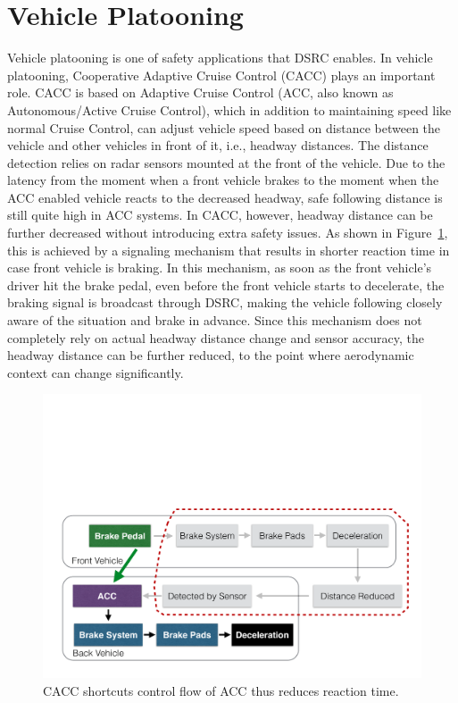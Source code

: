 \documentclass[12pt]{report}
\begin{document}
\section{Vehicle Platooning}
Vehicle platooning is one of safety applications that DSRC enables. In vehicle platooning, Cooperative Adaptive Cruise Control (CACC) plays an important role. CACC is based on Adaptive Cruise Control (ACC, also known as Autonomous/Active Cruise Control), which in addition to maintaining speed like normal Cruise Control, can adjust vehicle speed based on distance between the vehicle and other vehicles in front of it, i.e., headway distances. The distance detection relies on radar sensors mounted at the front of the vehicle. Due to the latency from the moment when a front vehicle brakes to the moment when the ACC enabled vehicle reacts to the decreased headway, safe following distance is still quite high in ACC systems. In CACC, however, headway distance can be further decreased without introducing extra safety issues. As shown in Figure~\ref{fig:brake}, this is achieved by a signaling mechanism that results in shorter reaction time in case front vehicle is braking. In this mechanism, as soon as the front vehicle's driver hit the brake pedal, even before the front vehicle starts to decelerate, the braking signal is broadcast through DSRC, making the vehicle following closely aware of the situation and brake in advance. Since this mechanism does not completely rely on actual headway distance change and sensor accuracy, the headway distance can be further reduced, to the point where aerodynamic context can change significantly.

\begin{figure}[htb]
  \begin{center}
    \includegraphics[width=.7\columnwidth]{figures/brake.pdf}
    \caption{\label{fig:brake}CACC shortcuts control flow of ACC thus reduces reaction time.}
  \end{center}
\end{figure}
\end{document}
